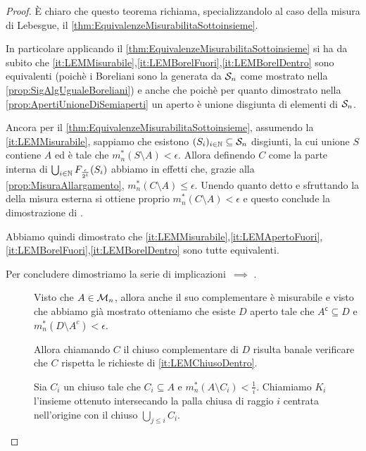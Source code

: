 \begin{proof}
	È chiaro che questo teorema richiama, specializzandolo al caso della misura di Lebesgue, il \cref{thm:EquivalenzeMisurabilitaSottoinsieme}.
	
	In particolare applicando il \cref{thm:EquivalenzeMisurabilitaSottoinsieme} si ha da subito che \ref{it:LEMMisurabile},\ref{it:LEMBorelFuori},\ref{it:LEMBorelDentro} sono equivalenti (poichè i Boreliani sono la \sigalg{} generata da $\S_n$ come mostrato nella \cref{prop:SigAlgUgualeBoreliani}) e anche che  poichè per quanto dimostrato nella \cref{prop:ApertiUnioneDiSemiaperti} un aperto è unione disgiunta di elementi di $\S_n$.
	
	Ancora per il \cref{thm:EquivalenzeMisurabilitaSottoinsieme}, assumendo la \ref{it:LEMMisurabile}, sappiamo che esistono $(S_i)_{i\in\N}\subseteq \S_n$ disgiunti, la cui unione $S$ contiene $A$ ed è tale che $m_n^*(S\setminus A)<\epsilon$.
	Allora definendo $C$ come la parte interna di $\bigcup_{i\in\N}F_\frac{\epsilon}{2^i}(S_i)$ abbiamo in effetti che, grazie alla \cref{prop:MisuraAllargamento}, $m_n^*(C\setminus A)\le \epsilon$.
	Unendo quanto detto e sfruttando la \sigsubadd[ità] della misura esterna si ottiene proprio $m_n^*(C\setminus A)<\epsilon$ e questo conclude la dimostrazione di .
	
	Abbiamo quindi dimostrato che \ref{it:LEMMisurabile},\ref{it:LEMApertoFuori},\ref{it:LEMBorelFuori},\ref{it:LEMBorelDentro} sono tutte equivalenti.
	
	Per concludere dimostriamo la serie di implicazioni $\,\implies\,\,$.
	\begin{description}
		\item[] Visto che $A\in\M_n$, allora anche il suo complementare è misurabile e visto che abbiamo già mostrato  otteniamo che esiste $D$ aperto tale che $A^\mathsf{c}\subseteq D$ e $m_n^*(D\setminus A^c)< \epsilon$.
		
		Allora chiamando $C$ il chiuso complementare di $D$ risulta banale verificare che $C$ rispetta le richieste di \ref{it:LEMChiusoDentro}.
		\item[] Sia $C_i$ un chiuso tale che $C_i\subseteq A$ e $m_n^*(A\setminus C_i)<\frac1i$.
		Chiamiamo $K_i$ l'insieme ottenuto intersecando la palla chiusa di raggio $i$ centrata nell'origine con il chiuso $\bigcup_{j\le i}C_i$.
		

\end{description}
\end{proof}
